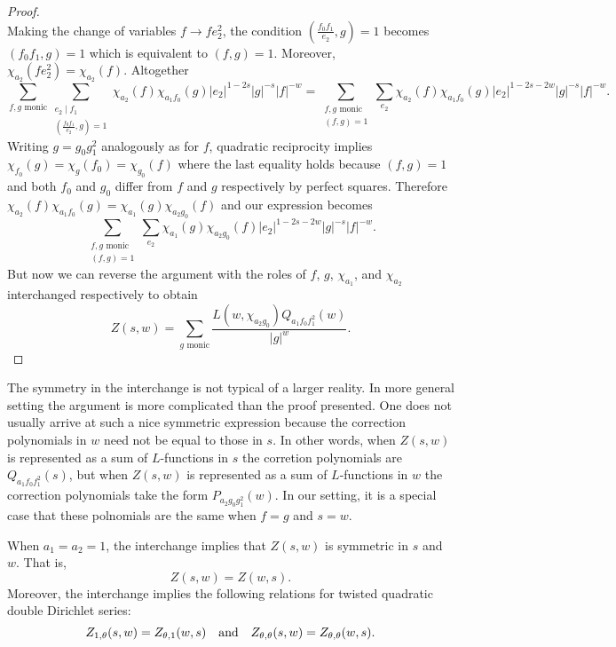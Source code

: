 \documentclass[12pt,reqno,oneside]{amsart}
\begin{document}
\begin{proof}
\[        \]
        Making the change of variables $f \to fe_{2}^{2}$, the condition $\left(\frac{f_{0}f_{1}}{e_{2}},g\right) = 1$ becomes $(f_{0}f_{1},g) = 1$ which is equivalent to $(f,g) = 1$. Moreover, $\chi_{a_{2}}(fe_{2}^{2}) = \chi_{a_{2}}(f)$. Altogether 
        \[
            \sum_{\text{$f,g$ monic}}\sum_{\substack{e_{2} \mid f_{1} \\ \left(\frac{f_{0}f_{1}}{e_{2}},g\right) = 1}}\chi_{a_{2}}(f)\chi_{a_{1}f_{0}}(g)|e_{2}|^{1-2s}|g|^{-s}|f|^{-w} = \sum_{\substack{\text{$f,g$ monic} \\ (f,g) = 1}}\sum_{e_{2}}\chi_{a_{2}}(f)\chi_{a_{1}f_{0}}(g)|e_{2}|^{1-2s-2w}|g|^{-s}|f|^{-w}.
        \]
        Writing $g = g_{0}g_{1}^{2}$ analogously as for $f$, quadratic reciprocity implies $\chi_{f_{0}}(g) = \chi_{g}(f_{0}) = \chi_{g_{0}}(f)$ where the last equality holds because $(f,g) = 1$ and both $f_{0}$ and $g_{0}$ differ from $f$ and $g$ respectively by perfect squares. Therefore $\chi_{a_{2}}(f)\chi_{a_{1}f_{0}}(g) = \chi_{a_{1}}(g)\chi_{a_{2}g_{0}}(f)$ and our expression becomes
        \[
            \sum_{\substack{\text{$f,g$ monic} \\ (f,g) = 1}}\sum_{e_{2}}\chi_{a_{1}}(g)\chi_{a_{2}g_{0}}(f)|e_{2}|^{1-2s-2w}|g|^{-s}|f|^{-w}.
        \]
        But now we can reverse the argument with the roles of $f$, $g$, $\chi_{a_{1}}$, and $\chi_{a_{2}}$ interchanged respectively to obtain
        \[
            Z(s,w) = \sum_{\text{$g$ monic}}\frac{L(w,\chi_{a_{2}g_{0}})Q_{a_{1}f_{0}f_{1}^{2}}(w)}{|g|^{w}}.
        \]
    \end{proof}

    The symmetry in the interchange is not typical of a larger reality. In more general setting the argument is more complicated than the proof presented. One does not usually arrive at such a nice symmetric expression because the correction polynomials in $w$ need not be equal to those in $s$. In other words, when $Z(s,w)$ is represented as a sum of $L$-functions in $s$ the corretion polynomials are $Q_{a_{1}f_{0}f_{1}^{2}}(s)$, but when $Z(s,w)$ is represented as a sum of $L$-functions in $w$ the correction polynomials take the form $P_{a_{2}g_{0}g_{1}^{2}}(w)$. In our setting, it is a special case that these polnomials are the same when $f = g$ and $s = w$.

    \begin{remark}\label{rem:symmetry_of_Double_Dirichlet_series}
        When $a_{1} = a_{2} = 1$, the interchange implies that $Z(s,w)$ is symmetric in $s$ and $w$. That is,
        \[
            Z(s,w) = Z(w,s).
        \]
        Moreover, the interchange implies the following relations for twisted quadratic double Dirichlet series:
        \[
            Z_{1,\theta}(s,w) = Z_{\theta,1}(w,s) \quad \text{and} \quad Z_{\theta,\theta}(s,w) = Z_{\theta,\theta}(w,s).
        \]
    \end{remark}
\end{document}
